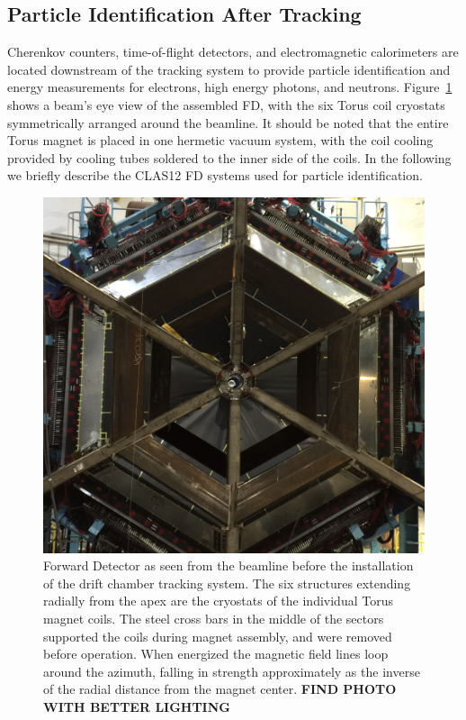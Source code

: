 \documentclass[final,3p,twocolumn]{elsarticle}
\begin{document}
\subsection{Particle Identification After Tracking}

Cherenkov counters, time-of-flight detectors, and electromagnetic calorimeters are located downstream of the
tracking system to provide particle identification and energy measurements for electrons, high energy photons,
and neutrons.  Figure~\ref{clas12-fd} shows a beam's eye view of the assembled FD, with the six Torus coil
cryostats symmetrically arranged around the beamline. It should be noted that the entire Torus magnet is placed
in one hermetic vacuum system, with the coil cooling provided by cooling tubes soldered to the inner side of the coils.  
In the following we briefly describe the CLAS12 FD systems used for particle identification. 

\begin{figure}[htbp!]
\centerline{\includegraphics[width=0.9\columnwidth]{clas12-fd.png}}
\caption{Forward Detector as seen from the beamline before the installation of the drift chamber tracking system.
The six structures extending radially from the apex are the cryostats of the individual Torus magnet coils. The steel
cross bars in the middle of the sectors supported the coils during magnet assembly, and were removed before operation.
When energized the magnetic field lines loop around the azimuth, falling in strength approximately as the inverse of
the radial distance from the magnet center.  {\bf FIND PHOTO WITH BETTER LIGHTING}}
\label{clas12-fd}
\end{figure}
\end{document}
